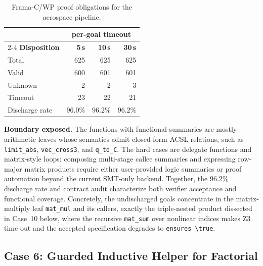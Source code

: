 \begin{table}[!t]
  \centering
  \caption{Frama-C/WP proof obligations for the aerospace pipeline.}
  \label{tab:case9-wp}
  \begin{tabular}{lrrr}
    \toprule
    & \multicolumn{3}{c}{\textbf{per-goal timeout}} \\
    \cmidrule(lr){2-4}
    \textbf{Disposition} & \textbf{5\,s} & \textbf{10\,s} & \textbf{30\,s} \\
    \midrule
    Total       & 625           & 625           & 625           \\
    Valid       & 600           & 601           & 601           \\
    Unknown     & 2             & 2             & 3             \\
    Timeout     & 23            & 22            & 21            \\
    \midrule
    Discharge rate & $96.0\%$ & $96.2\%$ & $96.2\%$ \\
    \bottomrule
  \end{tabular}
\end{table}

\smallskip
\noindent\textbf{Boundary exposed.}
{The functions with functional summaries are mostly arithmetic leaves whose semantics admit closed-form ACSL relations, such as \texttt{limit\_abs}, \texttt{vec\_cross3}, and \texttt{q\_to\_C}.} The hard cases are delegate functions and matrix-style loops: composing multi-stage callee summaries and expressing row-major matrix products require either user-provided logic summaries or proof automation beyond the current SMT-only backend. {Together, the $96.2\%$ discharge rate and contract audit characterize both verifier acceptance and functional coverage.} Concretely, the undischarged goals concentrate in the matrix-multiply leaf \texttt{mat\_mul} and its callers, exactly the triple-nested product dissected in Case~10 below, where the recursive \texttt{mat\_sum} over nonlinear indices makes Z3 time out and the accepted specification degrades to \texttt{ensures \textbackslash true}.

\subsection{Case 6: Guarded Inductive Helper for Factorial}
\label{app:case-factorial}

